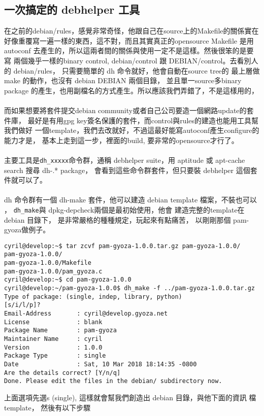   \subsection{一次搞定的 debhelper 工具}
  在之前的debian/rules，感覺非常奇怪，他跟自己在source上的Makefile的關係實在
  好像重覆寫一遍一樣的東西，這不對，而且其實真正的opensource Makefile 是用
  autoconf 去產生的，所以這兩者間的關係與使用一定不是這樣。然後很笨的是要寫
  兩個幾乎一樣的binary control, debian/control 跟 DEBIAN/control。去看別人的
  debian/rules， 只需要簡單的 dh 命令就好，他會自動在source tree的 最上層做
  make 的動作，也沒有 debian DEBIAN 兩個目錄， 並且單一source多binary 
  package 的產生，也用副檔名的方式產生。所以應該我們弄錯了，不是這樣用的，
  \\\\
  而如果想要將套件提交debian community或者自己公司要造一個網路update的套件庫，
  最好是有用gpg key簽名保護的套件，而control與rules的建造也能用工具幫我們做好
  一個template，我們去改就好，不過這最好能寫autoconf產生configure的能力才是，
  基本上走到這一步，裡面的build, 要非常的opensource才行了。
  \\\\
  主要工具是\verb=dh_xxxxx=命令群，通稱 debhelper suite，用 aptitude 或
  apt-cache search 搜尋 dh-.* package， 會看到這些命令群套件，但只要裝
  debhelper 這個套件就可以了。
  \\\\
  dh 命令群有一個 dh-make 套件，他可以建造 debian template 檔案，不裝也可以
  ， \verb=dh_make=與 dpkg-depcheck兩個是最初始使用，他會
  建造完整的template在debian 目錄下， 是非常嚴格的種種規定，玩起來有點痛苦，
  以剛剛那個 pam-gyoza做例子。
  \begin{verbatim}
cyril@develop:~$ tar zcvf pam-gyoza-1.0.0.tar.gz pam-gyoza-1.0.0/
pam-gyoza-1.0.0/
pam-gyoza-1.0.0/Makefile
pam-gyoza-1.0.0/pam_gyoza.c
cyril@develop:~$ cd pam-gyoza-1.0.0
cyril@develop:~/pam-gyoza-1.0.0$ dh_make -f ../pam-gyoza-1.0.0.tar.gz
Type of package: (single, indep, library, python)
[s/i/l/p]?
Email-Address       : cyril@develop.gyoza.net
License             : blank
Package Name        : pam-gyoza
Maintainer Name     : cyril
Version             : 1.0.0
Package Type        : single
Date                : Sat, 10 Mar 2018 18:14:35 -0800
Are the details correct? [Y/n/q]
Done. Please edit the files in the debian/ subdirectory now.
  \end{verbatim}
  上面選項先選s (single), 這樣就會幫我們創造出 debian 目錄，與他下面的資訊
  檔 template， 然後有以下步驟
